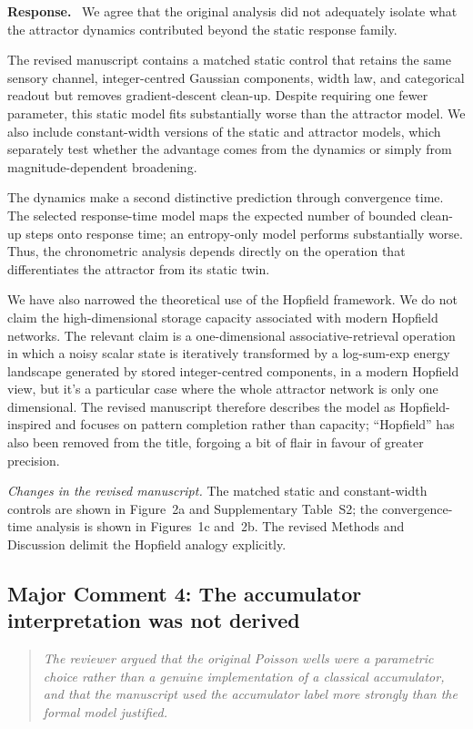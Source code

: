 \documentclass[11pt]{article}
\newenvironment{reviewercomment}{\begin{quote}\color{reviewgray}\itshape}{\end{quote}}
\newenvironment{authorresponse}{\par\noindent\textbf{\color{responseblue}Response.}\ }{\par}
\newcommand{\change}[1]{\par\noindent\textit{Changes in the revised manuscript.} #1\par}
\begin{document}
\begin{authorresponse}
We agree that the original analysis did not adequately isolate what the attractor dynamics contributed beyond the static response family.

The revised manuscript contains a matched static control that retains the same sensory channel, integer-centred Gaussian components, width law, and categorical readout but removes gradient-descent clean-up. Despite requiring one fewer parameter, this static model fits substantially worse than the attractor model. We also include constant-width versions of the static and attractor models, which separately test whether the advantage comes from the dynamics or simply from magnitude-dependent broadening.

The dynamics make a second distinctive prediction through convergence time. The selected response-time model maps the expected number of bounded clean-up steps onto response time; an entropy-only model performs substantially worse. Thus, the chronometric analysis depends directly on the operation that differentiates the attractor from its static twin.

We have also narrowed the theoretical use of the Hopfield framework. We do not claim the high-dimensional storage capacity associated with modern Hopfield networks. The relevant claim is a one-dimensional associative-retrieval operation in which a noisy scalar state is iteratively transformed by a log-sum-exp energy landscape generated by stored integer-centred components, in a modern Hopfield view, but it's a particular case where the whole attractor network is only one dimensional. The revised manuscript therefore describes the model as Hopfield-inspired and focuses on pattern completion rather than capacity; ``Hopfield'' has also been removed from the title, forgoing a bit of flair in favour of greater precision.
\end{authorresponse}

\change{The matched static and constant-width controls are shown in Figure~2a and Supplementary Table~S2; the convergence-time analysis is shown in Figures~1c and~2b. The revised Methods and Discussion delimit the Hopfield analogy explicitly.}

\subsection*{Major Comment 4: The accumulator interpretation was not derived}

\begin{reviewercomment}
The reviewer argued that the original Poisson wells were a parametric choice rather than a genuine implementation of a classical accumulator, and that the manuscript used the accumulator label more strongly than the formal model justified.
\end{reviewercomment}
\end{document}
